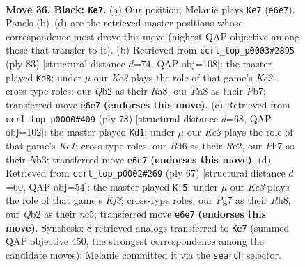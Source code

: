 \documentclass[11pt]{article}
\begin{document}
\clearpage

\begin{figure}[p]\centering
\begin{subfigure}{0.46\textwidth}\centering
\resizebox{\linewidth}{!}{%
\newchessgame
\chessboard[
  setfen={r6r/p5pp/3bk3/n2p1Q2/p2P2PP/4P2K/1q1N4/2R5 b - - 5 36},
  showmover=false,
  pgfstyle=straightmove, color=movearrow, markmove={e6-e7}
]}
\caption{}
\end{subfigure}\hfill
\begin{subfigure}{0.46\textwidth}\centering
\resizebox{\linewidth}{!}{%
\newchessgame
\chessboard[
  setfen={r7/pp2k3/1n1rpQ1p/6P1/8/P3b3/1P4P1/1B5K b - - 6 42},
  showmover=false,
  pgfstyle=straightmove, color=movearrow, markmove={e7-e8}
]}
\caption{}
\end{subfigure}
\\[4pt]
\begin{subfigure}{0.46\textwidth}\centering
\resizebox{\linewidth}{!}{%
\newchessgame
\chessboard[
  setfen={1r4k1/4B1p1/3p3p/3P4/P7/pN5P/PqP1R3/2K1R3 w - - 7 40},
  showmover=false,
  pgfstyle=straightmove, color=movearrow, markmove={c1-d1}
]}
\caption{}
\end{subfigure}\hfill
\begin{subfigure}{0.46\textwidth}\centering
\resizebox{\linewidth}{!}{%
\newchessgame
\chessboard[
  setfen={3r3r/5p1p/2p2k2/2N1p3/5b1Q/6R1/PPP1KP1P/q7 b - - 17 34},
  showmover=false,
  pgfstyle=straightmove, color=movearrow, markmove={f6-f5}
]}
\caption{}
\end{subfigure}
\caption{\textbf{Move 36, Black: \texttt{Ke7}.} (a) Our position; Melanie plays \texttt{Ke7} (\texttt{e6e7}). Panels (b)--(d) are the retrieved master positions whose correspondence most drove this move (highest QAP objective among those that transfer to it). (b) Retrieved from \texttt{ccrl\_top\_p0003\#2895} (ply 83) [structural distance $d$=74, QAP obj=108]: the master played \texttt{Ke8}; under $\mu$ our \emph{Ke3} plays the role of that game's \emph{Ke2}; cross-type roles: our \emph{Q}b2 as their \emph{R}a8, our \emph{R}a8 as their \emph{P}b7; transferred move \texttt{e6e7} \textbf{(endorses this move)}. (c) Retrieved from \texttt{ccrl\_top\_p0000\#409} (ply 78) [structural distance $d$=68, QAP obj=102]: the master played \texttt{Kd1}; under $\mu$ our \emph{Ke3} plays the role of that game's \emph{Kc1}; cross-type roles: our \emph{B}d6 as their \emph{R}e2, our \emph{P}h7 as their \emph{N}b3; transferred move \texttt{e6e7} \textbf{(endorses this move)}. (d) Retrieved from \texttt{ccrl\_top\_p0002\#269} (ply 67) [structural distance $d$=60, QAP obj=54]: the master played \texttt{Kf5}; under $\mu$ our \emph{Ke3} plays the role of that game's \emph{Kf3}; cross-type roles: our \emph{P}g7 as their \emph{R}h8, our \emph{Q}b2 as their \emph{n}c5; transferred move \texttt{e6e7} \textbf{(endorses this move)}. Synthesis: 8 retrieved analogs transferred to \texttt{Ke7} (summed QAP objective 450, the strongest correspondence among the candidate moves); Melanie committed it via the \texttt{search} selector.}
\label{fig:thought-m71}
\end{figure}
\end{document}
